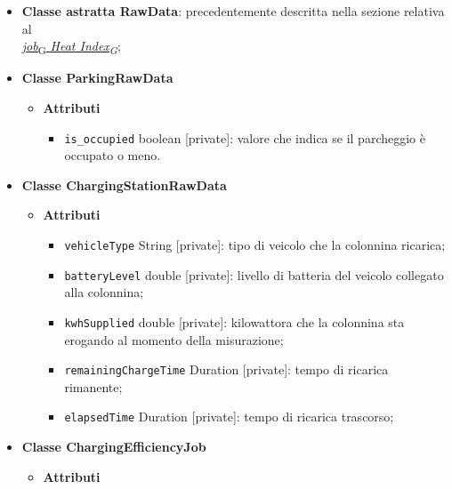 \begin{itemize}
	\item \textbf{Classe astratta RawData}: precedentemente descritta nella sezione relativa al \\\hyperref[abstract_class_raw_data]{\href{https://7last.github.io/docs/pb/documentazione-interna/glossario\#job}{\textit{\underline{job}}\textsubscript{G}}\underline{\textit{ \href{https://7last.github.io/docs/pb/documentazione-interna/glossario\#heat-index}{Heat Index\textsubscript{G}}}}};
	\item \textbf{Classe ParkingRawData}
	      \begin{itemize}
		      \item \textbf{Attributi}
		            \begin{itemize}
			            \item \texttt{is\_occupied} boolean [private]: valore che indica se il parcheggio è occupato o meno.
		            \end{itemize}
	      \end{itemize}
	\item \textbf{Classe ChargingStationRawData}
	      \begin{itemize}
		      \item \textbf{Attributi}
		            \begin{itemize}
			            \item \texttt{vehicleType} String [private]: tipo di veicolo che la colonnina ricarica;
			            \item \texttt{batteryLevel} double [private]: livello di batteria del veicolo collegato alla colonnina;
			            \item \texttt{kwhSupplied} double [private]: kilowattora che la colonnina sta erogando al momento della misurazione;
			            \item \texttt{remainingChargeTime} Duration [private]: tempo di ricarica rimanente;
			            \item \texttt{elapsedTime} Duration [private]: tempo di ricarica trascorso;
		            \end{itemize}
	      \end{itemize}
	\item \textbf{Classe ChargingEfficiencyJob}
	      \begin{itemize}
		      \item \textbf{Attributi}
		            \begin{itemize}

\end{itemize}
\end{itemize}
\end{itemize}
